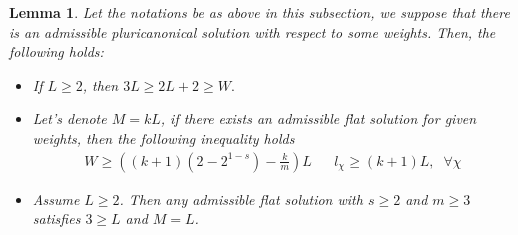 \documentclass[12pt,twoside,]{amsart}
\theoremstyle{plain}
\newtheorem{lemma}[theorem]{Lemma}
\theoremstyle{definition}
\begin{document}
\begin{lemma}
\label{lemma:ineq_comb}
Let the notations be as above in this subsection, we suppose that 
there is an admissible pluricanonical solution with respect to some weights.
Then, the following holds:
\begin{itemize}
    \item[1.] If $L \geq 2$, then $3L \geq  2L + 2 \geq  W.$
    \item[2.] Let's denote $M=kL$, if there exists an admissible flat solution for given weights, then the following inequality holds 
\begin{align*}
W
\geq 
\left( (k+1)(2 -2^{1-s})- \frac{k}{m}\right)L 
&&
l_\chi \geq (k+1)L, \; \; \forall \chi
\end{align*}
\item[3.] Assume $L \geq 2$. Then any admissible flat solution with $s \geq 2$ and $m \geq 3$ satisfies $3 \geq L$ and $M=L$.
\end{itemize}
\end{lemma}
\end{document}
